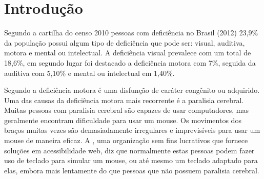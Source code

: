 \documentclass[
	12pt,			%
	openright,		%
	oneside,			%
	a4paper,			%
	chapter=TITLE,		%
	english,			%
	brazil,			%
	]{abntex2}
\begin{document}
\listoffigures*
\cleardoublepage

\listoftables*
\cleardoublepage



\tableofcontents*
\cleardoublepage



\textual

\chapter[Introdução]{Introdução}

Segundo a cartilha do censo 2010 pessoas com deficiência no Brasil (2012) 23,9\% da população possui algum tipo de deficiência que pode ser: visual, auditiva, motora e mental ou intelectual. A deficiência visual prevalece com um total de 18,6\%, em segundo lugar foi destacado a deficiência motora com 7\%, seguida da auditiva com 5,10\% e mental ou intelectual em 1,40\%.

Segundo \cite{lazarojcs} a deficiência motora é uma disfunção de caráter congênito ou adquirido. Uma das causas da deficiência motora mais recorrente é a paralisia cerebral. Muitas pessoas com paralisia cerebral são capazes de usar computadores, mas geralmente encontram dificuldade para usar um mouse. Os movimentos dos braços muitas vezes são demasiadamente irregulares e imprevisíveis para usar um mouse de maneira eficaz. A \cite{utah}, uma organização sem fins lucrativos que fornece soluções em acessibilidade web, diz que normalmente estas pessoas podem fazer uso de teclado para simular um mouse, ou até mesmo um teclado adaptado para elas, embora mais lentamente do que pessoas que não possuem paralisia cerebral.
\end{document}
